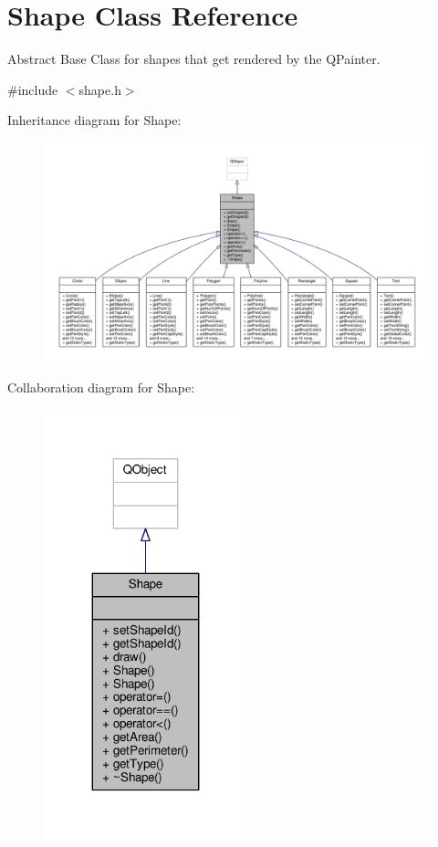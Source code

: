 \hypertarget{classShape}{}\section{Shape Class Reference}
\label{classShape}


Abstract Base Class for shapes that get rendered by the Q\+Painter.  




{\ttfamily \#include $<$shape.\+h$>$}



Inheritance diagram for Shape\+:\nopagebreak
\begin{figure}[H]
\begin{center}
\leavevmode
\includegraphics[width=350pt]{classShape__inherit__graph}
\end{center}
\end{figure}


Collaboration diagram for Shape\+:\nopagebreak
\begin{figure}[H]
\begin{center}
\leavevmode
\includegraphics[width=167pt]{classShape__coll__graph}
\end{center}
\end{figure}
